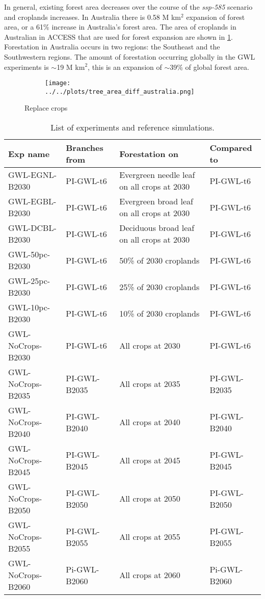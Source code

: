 \documentclass[]{article}
\begin{document}
In general, existing forest area decreases over the course of the \textit{ssp-585} scenario and croplands increases.
In Australia there is 0.58 M km$^2$ expansion of forest area, or a 61\% increase in Australia's forest area.
The area of croplands in Australian in ACCESS that are used for forest expansion are shown in \ref{fig:to_forest}.
Forestation in Australia occurs in two regions: the Southeast and the Southwestern regions.
The amount of forestation occurring globally in the GWL experiments is $\sim$19 M km$^2$, this is an expansion of $\sim$39\% of global forest area.

\begin{figure}[H]
    \begin{subfigure}[b]{\linewidth}
        \centering
        \texttt{[image: ../../plots/tree\_area\_diff\_australia.png]}
    \end{subfigure}
    \caption{Replace crops}
    \label{fig:to_forest}
\end{figure}

\begin{table}[]
    \caption{List of experiments and reference simulations.}
    \label{tab:experiments}
    \begin{tabular}{llll}
\hline
Exp name             & Branches from & Forestation on               & Compared to       \\ \hline
GWL-EGNL-B2030       & PI-GWL-t6     & Evergreen needle leaf on all crops at 2030            & PI-GWL-t6         \\
GWL-EGBL-B2030       & PI-GWL-t6     & Evergreen broad leaf on all crops at 2030            & PI-GWL-t6         \\
GWL-DCBL-B2030       & PI-GWL-t6     & Deciduous broad leaf on all crops at 2030            & PI-GWL-t6         \\
GWL-50pc-B2030       & PI-GWL-t6     & 50\% of 2030 croplands       & PI-GWL-t6         \\
GWL-25pc-B2030       & PI-GWL-t6     & 25\% of 2030 croplands       & PI-GWL-t6         \\
GWL-10pc-B2030       & PI-GWL-t6     & 10\% of 2030 croplands       & PI-GWL-t6         \\
GWL-NoCrops-B2030    & PI-GWL-t6     & All crops at 2030            & PI-GWL-t6         \\
GWL-NoCrops-B2035    & PI-GWL-B2035  & All crops at 2035            & PI-GWL-B2035      \\
GWL-NoCrops-B2040    & PI-GWL-B2040  & All crops at 2040            & PI-GWL-B2040      \\
GWL-NoCrops-B2045    & PI-GWL-B2045  & All crops at 2045            & PI-GWL-B2045      \\
GWL-NoCrops-B2050    & PI-GWL-B2050  & All crops at 2050            & PI-GWL-B2050      \\
GWL-NoCrops-B2055    & PI-GWL-B2055  & All crops at 2055            & PI-GWL-B2055      \\
GWL-NoCrops-B2060    & Pi-GWL-B2060  & All crops at 2060            & Pi-GWL-B2060      \\
\end{tabular}
\end{table}
\end{document}
